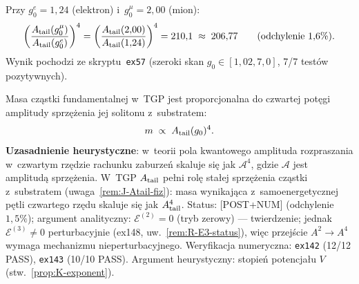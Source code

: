 \begin{remark}\label{rem:J-kluczowy}
Przy $g_0^e = 1{,}24$ (elektron) i~$g_0^\mu = 2{,}00$ (mion):
\begin{equation}\label{eq:J-r21-Atail}
  \left(\frac{A_{\rm tail}(g_0^\mu)}{A_{\rm tail}(g_0^e)}\right)^4
  = \left(\frac{A_{\rm tail}(2{,}00)}{A_{\rm tail}(1{,}24)}\right)^4
  = 210{,}1 \;\approx\; 206{,}77 \qquad (\text{odchylenie } 1{,}6\%).
\end{equation}
Wynik pochodzi ze skryptu~\texttt{ex57} (szeroki skan
$g_0 \in [1{,}02, 7{,}0]$, 7/7 testów pozytywnych).
\end{remark}

\begin{hypothesis}%
\label{hyp:J-mass-Atail4}
Masa cząstki fundamentalnej w~TGP jest proporcjonalna do czwartej potęgi
amplitudy sprzężenia jej solitonu z~substratem:
\begin{equation}\label{eq:J-mass-hyp}
  m \;\propto\; A_{\rm tail}(g_0)^4.
\end{equation}
\textbf{Uzasadnienie heurystyczne}: w~teorii pola kwantowego amplituda
rozpraszania w~czwartym rzędzie rachunku zaburzeń skaluje się jak
$\mathcal{A}^4$, gdzie $\mathcal{A}$ jest amplitudą sprzężenia.
W~TGP $A_{\rm tail}$ pełni rolę stałej sprzężenia cząstki z~substratem
(uwaga~\ref{rem:J-Atail-fiz}): masa wynikająca z~samoenergetycznej
pętli czwartego rzędu skaluje się jak $A_{\rm tail}^4$.
Status:  [POST+NUM] (odchylenie $1{,}5\%$);
argument analityczny: $\mathcal{E}^{(2)} = 0$ (tryb zerowy) --- twierdzenie;
jednak $\mathcal{E}^{(3)} \neq 0$ perturbacyjnie (ex148, uw.~\ref{rem:R-E3-status}),
więc przejście $A^2 \to A^4$ wymaga mechanizmu nieperturbacyjnego.
Weryfikacja numeryczna: \texttt{ex142} (12/12 PASS), \texttt{ex143} (10/10 PASS).
Argument heurystyczny: stopień potencjału $V$ (stw.~\ref{prop:K-exponent}).
\end{hypothesis}

